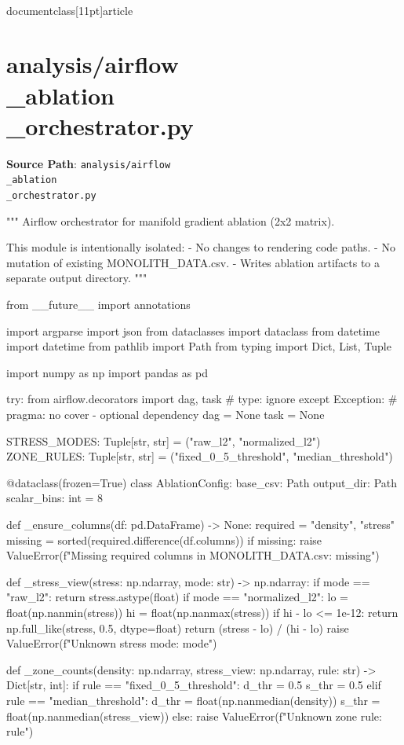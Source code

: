 \\documentclass[11pt]{article}
\begin{document}
\section*{analysis/airflow\\_ablation\\_orchestrator.py}
\textbf{Source Path}: \texttt{analysis/airflow\\_ablation\\_orchestrator.py}\par
\bigskip
\begin{CodeBlock}
"""
Airflow orchestrator for manifold gradient ablation (2x2 matrix).

This module is intentionally isolated:
- No changes to rendering code paths.
- No mutation of existing MONOLITH_DATA.csv.
- Writes ablation artifacts to a separate output directory.
"""

from __future__ import annotations

import argparse
import json
from dataclasses import dataclass
from datetime import datetime
from pathlib import Path
from typing import Dict, List, Tuple

import numpy as np
import pandas as pd

try:
    from airflow.decorators import dag, task  # type: ignore
except Exception:  # pragma: no cover - optional dependency
    dag = None
    task = None


STRESS_MODES: Tuple[str, str] = ("raw_l2", "normalized_l2")
ZONE_RULES: Tuple[str, str] = ("fixed_0_5_threshold", "median_threshold")


@dataclass(frozen=True)
class AblationConfig:
    base_csv: Path
    output_dir: Path
    scalar_bins: int = 8


def _ensure_columns(df: pd.DataFrame) -> None:
    required = {"density", "stress"}
    missing = sorted(required.difference(df.columns))
    if missing:
        raise ValueError(f"Missing required columns in MONOLITH_DATA.csv: {missing}")


def _stress_view(stress: np.ndarray, mode: str) -> np.ndarray:
    if mode == "raw_l2":
        return stress.astype(float)
    if mode == "normalized_l2":
        lo = float(np.nanmin(stress))
        hi = float(np.nanmax(stress))
        if hi - lo <= 1e-12:
            return np.full_like(stress, 0.5, dtype=float)
        return (stress - lo) / (hi - lo)
    raise ValueError(f"Unknown stress mode: {mode}")


def _zone_counts(density: np.ndarray, stress_view: np.ndarray, rule: str) -> Dict[str, int]:
    if rule == "fixed_0_5_threshold":
        d_thr = 0.5
        s_thr = 0.5
    elif rule == "median_threshold":
        d_thr = float(np.nanmedian(density))
        s_thr = float(np.nanmedian(stress_view))
    else:
        raise ValueError(f"Unknown zone rule: {rule}")


\end{CodeBlock}
\end{document}
